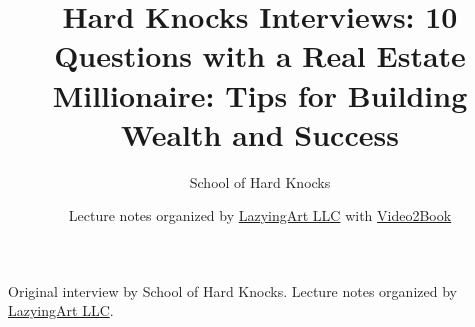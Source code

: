 \documentclass[11pt,oneside]{book}
\begin{document}
\frontmatter
\title{Hard Knocks Interviews: 10 Questions with a Real Estate Millionaire: Tips for Building Wealth and Success}
\author{School of Hard Knocks}
\date{Lecture notes organized by \href{https://lazying.art}{LazyingArt LLC} with \href{https://github.com/lachlanchen/Video2Book}{Video2Book}}
\maketitle
\begin{center}
\small Original interview by School of Hard Knocks. Lecture notes organized by \href{https://lazying.art}{LazyingArt LLC}.
\end{center}
\clearpage
\mainmatter

\end{document}
